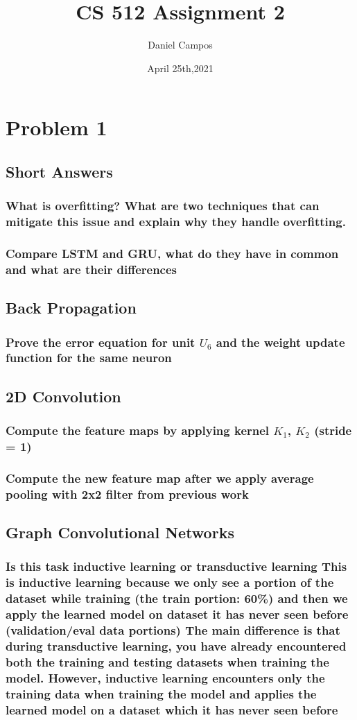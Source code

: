 \documentclass[11pt]{article}
\title{CS 512 Assignment 2}
\author{Daniel Campos}
\date{April 25th,2021}
\begin{document}
\maketitle
\section{Problem 1}
\subsection{Short Answers}
\subsubsection{What is overfitting? What are two techniques that can mitigate this issue and explain why they handle overfitting.}
\subsubsection{Compare LSTM and GRU, what do they have in common and what are their differences}
\subsection{Back Propagation}
\subsubsection{Prove the error equation for unit $U_6$ and the weight update function for the same neuron}
\subsection{2D Convolution}
\subsubsection{Compute the feature maps by applying kernel $K_1$, $K_2$ (stride = 1)}
\subsubsection{Compute the new feature map after we apply average pooling with 2x2 filter from previous work}
\subsection{Graph Convolutional Networks}
\subsubsection{Is this task inductive learning or transductive learning
This is inductive learning because we only see a portion of the dataset while training (the train portion: 60\%) and then we apply the learned model on dataset it has never seen before (validation/eval data portions)
The main difference is that during transductive learning, you have already encountered both the training and testing datasets when training the model. However, inductive learning encounters only the training data when training the model and applies the learned model on a dataset which it has never seen before}
\end{document}
